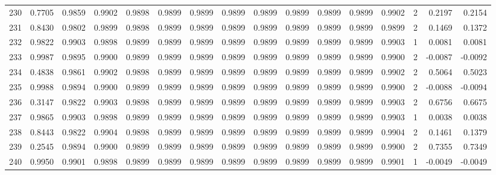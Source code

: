 \begin{tabular}{lrrrrrrrrrrrrrrr}
230 &      0.7705 &  0.9859 &  0.9902 &  0.9898 &  0.9899 &  0.9899 &  0.9899 &  0.9899 &  0.9899 &  0.9899 &   0.9899 &     0.9902 &      2 &                    0.2197 &                     0.2154 \\
231 &      0.8430 &  0.9802 &  0.9899 &  0.9898 &  0.9899 &  0.9899 &  0.9899 &  0.9899 &  0.9899 &  0.9899 &   0.9899 &     0.9899 &      2 &                    0.1469 &                     0.1372 \\
232 &      0.9822 &  0.9903 &  0.9898 &  0.9899 &  0.9899 &  0.9899 &  0.9899 &  0.9899 &  0.9899 &  0.9899 &   0.9899 &     0.9903 &      1 &                    0.0081 &                     0.0081 \\
233 &      0.9987 &  0.9895 &  0.9900 &  0.9899 &  0.9899 &  0.9899 &  0.9899 &  0.9899 &  0.9899 &  0.9899 &   0.9899 &     0.9900 &      2 &                   -0.0087 &                    -0.0092 \\
234 &      0.4838 &  0.9861 &  0.9902 &  0.9898 &  0.9899 &  0.9899 &  0.9899 &  0.9899 &  0.9899 &  0.9899 &   0.9899 &     0.9902 &      2 &                    0.5064 &                     0.5023 \\
235 &      0.9988 &  0.9894 &  0.9900 &  0.9899 &  0.9899 &  0.9899 &  0.9899 &  0.9899 &  0.9899 &  0.9899 &   0.9899 &     0.9900 &      2 &                   -0.0088 &                    -0.0094 \\
236 &      0.3147 &  0.9822 &  0.9903 &  0.9898 &  0.9899 &  0.9899 &  0.9899 &  0.9899 &  0.9899 &  0.9899 &   0.9899 &     0.9903 &      2 &                    0.6756 &                     0.6675 \\
237 &      0.9865 &  0.9903 &  0.9898 &  0.9899 &  0.9899 &  0.9899 &  0.9899 &  0.9899 &  0.9899 &  0.9899 &   0.9899 &     0.9903 &      1 &                    0.0038 &                     0.0038 \\
238 &      0.8443 &  0.9822 &  0.9904 &  0.9898 &  0.9899 &  0.9899 &  0.9899 &  0.9899 &  0.9899 &  0.9899 &   0.9899 &     0.9904 &      2 &                    0.1461 &                     0.1379 \\
239 &      0.2545 &  0.9894 &  0.9900 &  0.9899 &  0.9899 &  0.9899 &  0.9899 &  0.9899 &  0.9899 &  0.9899 &   0.9899 &     0.9900 &      2 &                    0.7355 &                     0.7349 \\
240 &      0.9950 &  0.9901 &  0.9898 &  0.9899 &  0.9899 &  0.9899 &  0.9899 &  0.9899 &  0.9899 &  0.9899 &   0.9899 &     0.9901 &      1 &                   -0.0049 &                    -0.0049 \\

\end{tabular}
